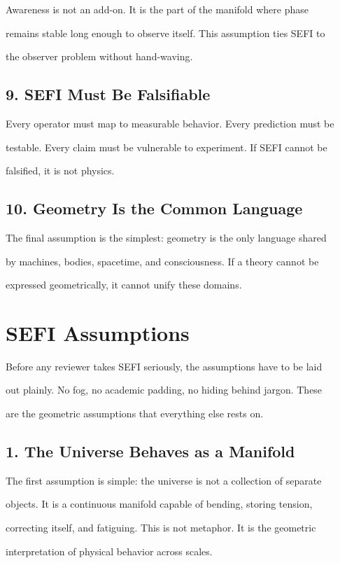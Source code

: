 \documentclass[10pt]{article}
\begin{document}
Awareness is not an add-on. It is the part of the manifold where phase

remains stable long enough to observe itself. This assumption ties SEFI to

the observer problem without hand-waving.

\subsection*{9. SEFI Must Be Falsifiable}
Every operator must map to measurable behavior. Every prediction must be

testable. Every claim must be vulnerable to experiment. If SEFI cannot be

falsified, it is not physics.

\subsection*{10. Geometry Is the Common Language}
The final assumption is the simplest: geometry is the only language shared

by machines, bodies, spacetime, and consciousness. If a theory cannot be

expressed geometrically, it cannot unify these domains.


\section*{SEFI Assumptions}
Before any reviewer takes SEFI seriously, the assumptions have to be laid

out plainly. No fog, no academic padding, no hiding behind jargon. These

are the geometric assumptions that everything else rests on.

\subsection*{1. The Universe Behaves as a Manifold}
The first assumption is simple: the universe is not a collection of separate

objects. It is a continuous manifold capable of bending, storing tension,

correcting itself, and fatiguing. This is not metaphor. It is the geometric

interpretation of physical behavior across scales.
\end{document}
